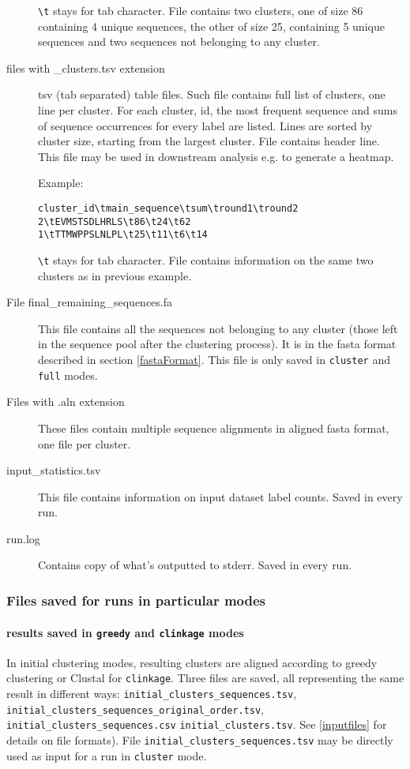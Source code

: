\documentclass[11pt, a4paper, twoside, titlepage]{article}
\begin{document}
\begin{description}
\texttt{\textbackslash t} stays for tab character. File contains two clusters, one of size 86 containing 4 unique sequences, the other of size 25, containing 5 unique sequences and two sequences not belonging to any cluster.

\item[files with \_clusters.tsv extension] tsv (tab separated) table files. Such file contains full list of clusters, one line per cluster. For each cluster, id, the most frequent sequence and sums of sequence occurrences for every label are listed. Lines are sorted by cluster size, starting from the largest cluster. File contains header line. This file may be used in downstream analysis e.g. to generate a heatmap.

Example:

\begin{verbatim}
cluster_id\tmain_sequence\tsum\tround1\tround2
2\tEVMSTSDLHRLS\t86\t24\t62
1\tTTMWPPSLNLPL\t25\t11\t6\t14
\end{verbatim}

\texttt{\textbackslash t} stays for tab character. File contains information on the same two clusters as in previous example.

\item[File final\_remaining\_sequences.fa] This file contains all the sequences not belonging to any cluster (those left in the sequence pool after the clustering process). It is in the fasta format described in section \ref{fastaFormat}. This file is only saved in \texttt{cluster} and \texttt{full} modes.
\item[Files with .aln extension] These files contain multiple sequence alignments in aligned fasta format, one file per cluster. 
\item[input\_statistics.tsv] This file contains information on input dataset label counts. Saved in every run.
\item[run.log] Contains copy of what's outputted to stderr. Saved in every run.

\end{description}

\subsubsection{Files saved for runs in particular modes}
\label{filesSavedForRuns}
\paragraph{results saved in \texttt{greedy} and \texttt{clinkage} modes} In initial clustering modes, resulting clusters are aligned according to greedy clustering or Clustal for \texttt{clinkage}. Three files are saved, all representing the same result in different ways: \texttt{initial\_clusters\_sequences.tsv}, \texttt{initial\_clusters\_sequences\_original\_order.tsv}, \newline\texttt{initial\_clusters\_sequences.csv} \texttt{initial\_clusters.tsv}. See \ref{inputfiles} for details on file formats).  File \texttt{initial\_clusters\_sequences.tsv} may be directly used as input for a run in \texttt{cluster} mode.
\end{document}
